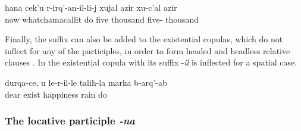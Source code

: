 \begin{exe}
	\ex	\label{ex:‎now for the one who operates her 5000, 50000 rubles}
	\gll	hana	cek'u	r-irq'-an-il-li-j	xujal	azir	xu-c'al	azir\\
		now	whatchamacallit	do	five	thousand	five-	thousand\\
	\glt	{}
\end{exe}

Finally, the suffix  can also be added to the existential copulas, which do not inflect for any of the participles, in order to form headed and headless relative clauses . In  the existential copula with its suffix -\textit{il} is inflected for a spatial case.
%
\begin{exe}
	\ex	\label{ex:‎My dear, may on the place where you (fem.) are rain the rain of happiness}
	\gll	durqa-ce,	u	le-r-il-le	taliħ-la	marka	b-arq'-ab\\
		dear		exist	happiness	rain	do\\
	\glt	{}
\end{exe}


\subsubsection{The locative participle \textit{-na}}
\label{sssec:The locative participle}

